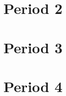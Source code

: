 \documentclass[12pt]{article}
\begin{document}
\maketitle

\section{Period 2}

\section{Period 3}

\section{Period 4}
\end{document}

